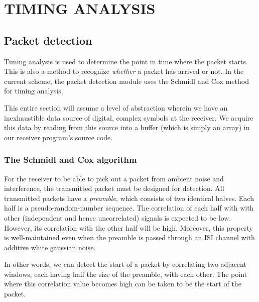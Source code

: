 \chapter{TIMING ANALYSIS}
\label{chap:timing}


\section{Packet detection}

Timing analysis is used to determine the point in time where the packet starts.
This is also a method to recognize \emph{whether} a packet has arrived or not.
In the current scheme, the packet detection module uses the Schmidl and Cox %
method for timing analysis.

This entire section will assume a level of abstraction wherein we have an
inexhaustible data source of digital, complex symbols at the receiver. We
acquire this data by reading from this source into a buffer (which is simply an
array) in our receiver program's source code.

\subsection{The Schmidl and Cox algorithm}

For the receiver to be able to pick out a packet from ambient noise and
interference, the transmitted packet must be designed for detection. All
transmitted packets have a \emph{preamble}, which consists of two identical
halves. Each half is a pseudo-random-number sequence. The correlation of each
half with with other (independent and hence uncorrelated) signals is expected
to be low. However, its correlation with the other half will be high. Moreover,
this property is well-maintained even when the preamble is passed through an
ISI channel with additive white gaussian noise.

In other words, we can detect the start of a packet by correlating two adjacent
windows, each having half the size of the preamble, with each other. The point
where this correlation value becomes high can be taken to be the start of the
packet.


